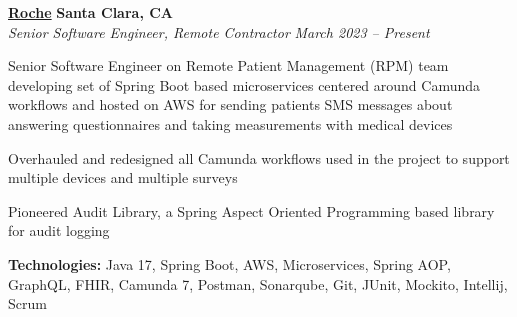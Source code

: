 %
    \headerrow
        {\textbf{\href{https://www.roche.com/}{Roche}}}
        {\textbf{Santa Clara, CA}}
    \\
    \headerrow
        {\emph{Senior Software Engineer, Remote Contractor}}
        {\emph{March 2023 -- Present}}
    \begin{itemize*}
        \item Senior Software Engineer on Remote Patient Management (RPM) team developing set of Spring Boot based microservices centered around Camunda workflows and hosted on AWS for sending patients SMS messages about answering questionnaires and taking measurements with medical devices
        \item Overhauled and redesigned all Camunda workflows used in the project to support multiple devices and multiple surveys
        \item Pioneered Audit Library, a Spring Aspect Oriented Programming based library for audit logging
    \end{itemize*}

    \hspace{1.0em}
        {\textbf{Technologies:} Java 17, Spring Boot, AWS, Microservices, Spring AOP, GraphQL, FHIR, Camunda 7, Postman, Sonarqube, Git, JUnit, Mockito, Intellij, Scrum}

